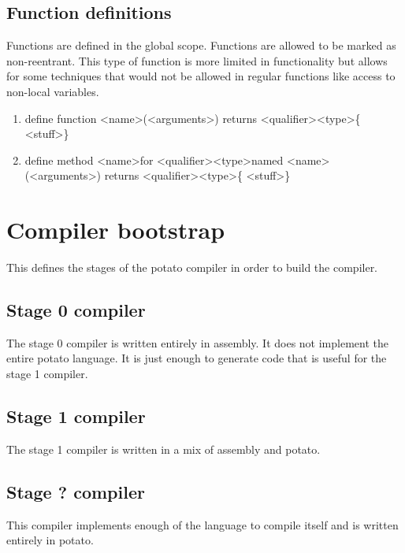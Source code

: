 \documentclass[12pt]{article}
\begin{document}
\subsection {Function definitions}
Functions are defined in the global scope. Functions are allowed to be marked as non-reentrant. This type of function is more limited in functionality but allows for some techniques that would not be allowed in regular functions like access to non-local variables.

\begin{enumerate}

\item define function \textless name\textgreater (\textless arguments\textgreater) returns \textless qualifier\textgreater \space \textless type\textgreater \{ \textless stuff\textgreater \}

\item define method \textless name\textgreater \space for \textless qualifier\textgreater  \space \textless type\textgreater \space named  \textless name\textgreater \space  (\textless arguments\textgreater) returns \textless qualifier\textgreater \space \textless type\textgreater \{ \textless stuff\textgreater \}

\end{enumerate}

\section {Compiler bootstrap}

This defines the stages of the potato compiler in order to build the compiler.

\subsection {Stage 0 compiler}
The stage 0 compiler is written entirely in assembly. It does not implement the entire potato language. It is just enough 
to generate code that is useful for the stage 1 compiler.

\subsection {Stage 1 compiler}
The stage 1 compiler is written in a mix of assembly and potato.

\subsection {Stage ? compiler}
This compiler implements enough of the language to compile itself and is written entirely in potato.
\end{document}
